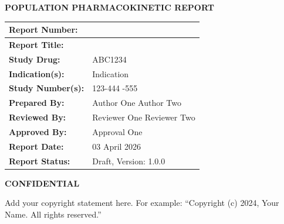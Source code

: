 \documentclass[
  letterpaper,
  toc=chapterentrywithdots,
  listof=totoc,
  11pt,
  headings=small,
  usegeometry]{scrreprt}
\renewcommand*\contentsname{Table of contents}
\newcommand\contentsname{Table of contents}
\renewcommand*\figurename{Figure}
\newcommand\figurename{Figure}
\renewcommand*\tablename{Table}
\newcommand\tablename{Table}
\begin{document}
\thispagestyle{empty}
\vskip2cm
{\centerline{\textbf{POPULATION PHARMACOKINETIC REPORT}}}
\vskip1cm
\begin{table}[!h]
      \setlength{\tabcolsep}{5pt}
      \renewcommand{\arraystretch}{1.5}
      \begin{tabularx}{\textwidth}{|p{}|X|}
            \hline
            \textbf{Report Number:} & \\
            \hline
            \textbf{Report Title:} &  \\
            \hline
            \textbf{Study Drug:} &  ABC1234\\
            \hline
            \textbf{Indication(s):} & Indication\\
            \hline
            \textbf{Study Number(s):} & 123-444 \newline 123-555\\
            \hline
            \textbf{Prepared By:} & Author One \newline Author Two\\
            \hline
            \textbf{Reviewed By:} & Reviewer One \newline Reviewer
Two \\
            \hline
            \textbf{Approved By:} & Approval One\\
            \hline
            \textbf{Report Date:} & 03 April 2026\\
            \hline
            \textbf{Report Status:}  & Draft, Version: 1.0.0\\
            \hline
      \end{tabularx}
\end{table}
\vskip1.5cm
\begin{center}
{\textbf{CONFIDENTIAL}}
\begin{mdframed}
    {\normalsize Add your copyright statement here. For example:
``Copyright (c) 2024, Your Name. All rights reserved.''}
\end{mdframed}
\end{center}


\renewcommand*\contentsname{TABLE OF CONTENTS}
{
\hypersetup{linkcolor=blue}
\setcounter{tocdepth}{2}
\tableofcontents
}
{%
\let\oldnumberline\numberline%
\renewcommand{\numberline}{\figurename~\oldnumberline}%
\listoffigures%
}

{%
\let\oldnumberline\numberline%
\renewcommand{\numberline}{\tablename~\oldnumberline}%
\listoftables%
}
\end{document}
